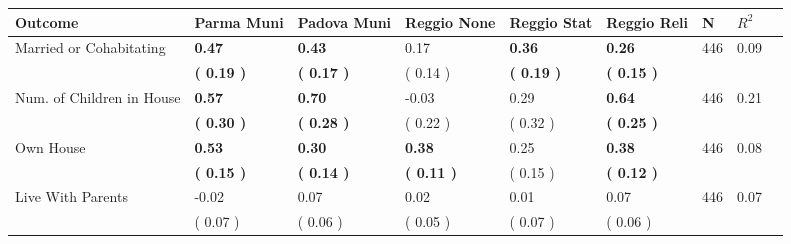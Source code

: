 \begin{tabular}{L{6.2cm} C{1.8cm} C{1.8cm} C{1.8cm} C{1.8cm} C{1.8cm} C{1.8cm} C{0.3cm} C{0.3cm}}
\toprule
 \textbf{Outcome} & \textbf{Parma Muni} & \textbf{Padova Muni} & \textbf{Reggio None} & \textbf{Reggio Stat} & \textbf{Reggio Reli} & \textbf{N} & \textbf{$ R^2$} \\
\midrule
Married or Cohabitating & \textbf{     0.47} & \textbf{     0.43} &      0.17 & \textbf{     0.36} & \textbf{     0.26}  & 446 &       0.09 \\ 
 & \textbf{(     0.19 )} & \textbf{(     0.17 )} & (     0.14 ) & \textbf{(     0.19 )} & \textbf{(     0.15 )}  & \\
Num. of Children in House & \textbf{     0.57} & \textbf{     0.70} &     -0.03 &      0.29 & \textbf{     0.64}  & 446 &       0.21 \\ 
 & \textbf{(     0.30 )} & \textbf{(     0.28 )} & (     0.22 ) & (     0.32 ) & \textbf{(     0.25 )}  & \\
Own House & \textbf{     0.53} & \textbf{     0.30} & \textbf{     0.38} &      0.25 & \textbf{     0.38}  & 446 &       0.08 \\ 
 & \textbf{(     0.15 )} & \textbf{(     0.14 )} & \textbf{(     0.11 )} & (     0.15 ) & \textbf{(     0.12 )}  & \\
Live With Parents &     -0.02 &      0.07 &      0.02 &      0.01 &      0.07  & 446 &       0.07 \\ 
 & (     0.07 ) & (     0.06 ) & (     0.05 ) & (     0.07 ) & (     0.06 )  & \\
\bottomrule
\end{tabular}

